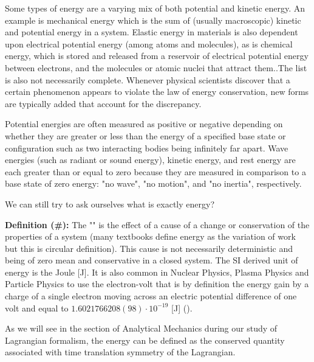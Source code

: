 	Some types of energy are a varying mix of both potential and kinetic energy. An example is mechanical energy which is the sum of (usually macroscopic) kinetic and potential energy in a system. Elastic energy in materials is also dependent upon electrical potential energy (among atoms and molecules), as is chemical energy, which is stored and released from a reservoir of electrical potential energy between electrons, and the molecules or atomic nuclei that attract them..The list is also not necessarily complete. Whenever physical scientists discover that a certain phenomenon appears to violate the law of energy conservation, new forms are typically added that account for the discrepancy.

	Potential energies are often measured as positive or negative depending on whether they are greater or less than the energy of a specified base state or configuration such as two interacting bodies being infinitely far apart. Wave energies (such as radiant or sound energy), kinetic energy, and rest energy are each greater than or equal to zero because they are measured in comparison to a base state of zero energy: "no wave", "no motion", and "no inertia", respectively.
	
	We can still try to ask ourselves what is exactly energy?
	
	\textbf{Definition (\#\mydef):} The "" is the effect of a cause of a change or conservation of the properties of a system (many textbooks define energy as the variation of work but this is circular definition). This cause is not necessarily deterministic and being of zero mean and conservative in a closed system. The SI derived unit of energy is the Joule [J]. It is also common in Nuclear Physics, Plasma Physics and Particle Physics to use the electron-volt that is by definition the energy gain by a charge of a single electron moving across an electric potential difference of one volt and equal to $1.6021766208(98)\cdot 10^{-19}$ [J] ().
	
	As we will see in the section of Analytical Mechanics during our study of Lagrangian formalism, the energy can be defined as the conserved quantity associated with time translation symmetry of the Lagrangian.
	
